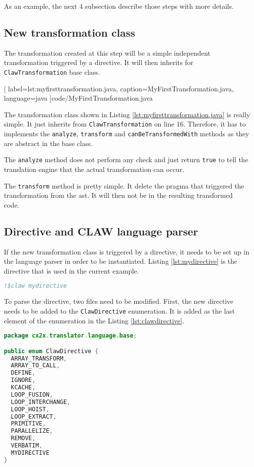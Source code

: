 As an example, the next 4 subsection describe those steps with more details.

\subsection{New transformation class}
The transformation created at this step will be a simple independent
transformation triggered by a directive. It will then inherits for 
\lstinline|ClawTransformation| base class.


  [
    label=lst:myfirsttransformation.java,
    caption=MyFirstTransformation.java,
    language=java
  ]{code/MyFirstTransformation.java}

The transformation class shown in Listing \ref{lst:myfirsttransformation.java}
is really simple. It just inherits from \lstinline|ClawTransformation| on line
16. Therefore, it has to implements the \lstinline|analyze|,
\lstinline|transform| and \lstinline|canBeTransformedWith| methods as they are
abstract in the base class.

The \lstinline|analyze| method does not perform any check and just return
\lstinline|true| to tell the translation engine that the actual
transformation can occur.

The \lstinline|transform| method is pretty simple. It delete the pragma that
triggered the transformation from the \gls{ast}. It will then not be in the
resulting transformed code.

\subsection{Directive and CLAW language parser}
If the new transformation class is triggered by a directive, it needs to
be set up in the language parser in order to be instantiated. Listing
\ref{lst:mydirective} is the directive that is used in the current example.

\begin{lstlisting}[label=lst:mydirective, caption=Example directive, language=fortran]
!$claw mydirective
\end{lstlisting}

To parse the directive, two files need to be modified. First, the new directive
needs to be added to the \lstinline|ClawDirective| enumeration. It is added as
the last element of the enumeration in the Listing \ref{lst:clawdirective}.

\begin{lstlisting}[label=lst:clawdirective, caption=ClawDirective.java, language=java]
package cx2x.translator.language.base;

public enum ClawDirective {
  ARRAY_TRANSFORM,
  ARRAY_TO_CALL,
  DEFINE,
  IGNORE,
  KCACHE,
  LOOP_FUSION,
  LOOP_INTERCHANGE,
  LOOP_HOIST,
  LOOP_EXTRACT,
  PRIMITIVE,
  PARALLELIZE,
  REMOVE,
  VERBATIM,
  MYDIRECTIVE
}
\end{lstlisting}

